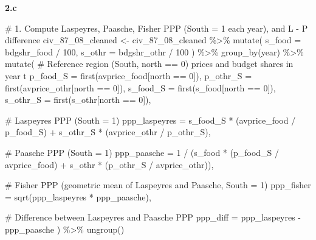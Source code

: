 \documentclass[
  letterpaper,
  DIV=11,
  numbers=noendperiod]{scrartcl}
\newenvironment{Shaded}{\begin{snugshade}}{\end{snugshade}}
\newcommand{\AttributeTok}[1]{\textcolor[rgb]{0.40,0.45,0.13}{#1}}
\newcommand{\CommentTok}[1]{\textcolor[rgb]{0.37,0.37,0.37}{#1}}
\newcommand{\DecValTok}[1]{\textcolor[rgb]{0.68,0.00,0.00}{#1}}
\newcommand{\FunctionTok}[1]{\textcolor[rgb]{0.28,0.35,0.67}{#1}}
\newcommand{\NormalTok}[1]{\textcolor[rgb]{0.00,0.23,0.31}{#1}}
\newcommand{\OtherTok}[1]{\textcolor[rgb]{0.00,0.23,0.31}{#1}}
\newcommand{\SpecialCharTok}[1]{\textcolor[rgb]{0.37,0.37,0.37}{#1}}
\begin{document}
\textbf{2.c}

\begin{Shaded}
\begin{Highlighting}[]
\CommentTok{\# 1. Compute Laspeyres, Paasche, Fisher PPP (South = 1 each year), and L {-} P difference}
\NormalTok{civ\_87\_08\_cleaned }\OtherTok{\textless{}{-}}\NormalTok{ civ\_87\_08\_cleaned }\SpecialCharTok{\%\textgreater{}\%}
  \FunctionTok{mutate}\NormalTok{(}
    \AttributeTok{s\_food =}\NormalTok{ bdgshr\_food }\SpecialCharTok{/} \DecValTok{100}\NormalTok{,}
    \AttributeTok{s\_othr =}\NormalTok{ bdgshr\_othr }\SpecialCharTok{/} \DecValTok{100}
\NormalTok{  ) }\SpecialCharTok{\%\textgreater{}\%}
  \FunctionTok{group\_by}\NormalTok{(year) }\SpecialCharTok{\%\textgreater{}\%}
  \FunctionTok{mutate}\NormalTok{(}
    \CommentTok{\# Reference region (South, north == 0) prices and budget shares in year t}
    \AttributeTok{p\_food\_S =} \FunctionTok{first}\NormalTok{(avprice\_food[north }\SpecialCharTok{==} \DecValTok{0}\NormalTok{]),}
    \AttributeTok{p\_othr\_S =} \FunctionTok{first}\NormalTok{(avprice\_othr[north }\SpecialCharTok{==} \DecValTok{0}\NormalTok{]),}
    \AttributeTok{s\_food\_S =} \FunctionTok{first}\NormalTok{(s\_food[north }\SpecialCharTok{==} \DecValTok{0}\NormalTok{]),}
    \AttributeTok{s\_othr\_S =} \FunctionTok{first}\NormalTok{(s\_othr[north }\SpecialCharTok{==} \DecValTok{0}\NormalTok{]),}
    
    \CommentTok{\# Laspeyres PPP (South = 1)}
    \AttributeTok{ppp\_laspeyres =}\NormalTok{ s\_food\_S }\SpecialCharTok{*}\NormalTok{ (avprice\_food }\SpecialCharTok{/}\NormalTok{ p\_food\_S) }\SpecialCharTok{+}
\NormalTok{                    s\_othr\_S }\SpecialCharTok{*}\NormalTok{ (avprice\_othr }\SpecialCharTok{/}\NormalTok{ p\_othr\_S),}
    
    \CommentTok{\# Paasche PPP (South = 1)}
    \AttributeTok{ppp\_paasche =} \DecValTok{1} \SpecialCharTok{/}\NormalTok{ (s\_food }\SpecialCharTok{*}\NormalTok{ (p\_food\_S }\SpecialCharTok{/}\NormalTok{ avprice\_food) }\SpecialCharTok{+}
\NormalTok{                       s\_othr }\SpecialCharTok{*}\NormalTok{ (p\_othr\_S }\SpecialCharTok{/}\NormalTok{ avprice\_othr)),}
    
    \CommentTok{\# Fisher PPP (geometric mean of Laspeyres and Paasche, South = 1)}
    \AttributeTok{ppp\_fisher =} \FunctionTok{sqrt}\NormalTok{(ppp\_laspeyres }\SpecialCharTok{*}\NormalTok{ ppp\_paasche),}
    
    \CommentTok{\# Difference between Laspeyres and Paasche PPP}
    \AttributeTok{ppp\_diff =}\NormalTok{ ppp\_laspeyres }\SpecialCharTok{{-}}\NormalTok{ ppp\_paasche}
\NormalTok{  ) }\SpecialCharTok{\%\textgreater{}\%}
  \FunctionTok{ungroup}\NormalTok{()}


\end{Highlighting}
\end{Shaded}
\end{document}
